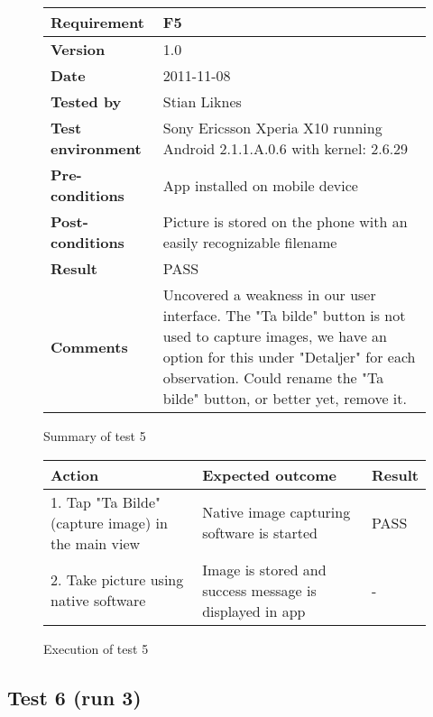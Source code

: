 	\begin{figure}[htb]
		\centering
		\begin{tabular}{|p{3.5cm}|p{7.0cm}|} \hline
			\textbf{Requirement} & F5 \\ \hline
			\textbf{Version} & 1.0 \\ \hline
			\textbf{Date} & 2011-11-08 \\ \hline
			\textbf{Tested by} & Stian Liknes \\ \hline
			\textbf{Test environment} & Sony Ericsson Xperia X10 running Android 2.1.1.A.0.6 with kernel: 2.6.29 \\ \hline
			\textbf{Pre-conditions} & App installed on mobile device \\ \hline
			\textbf{Post-conditions} & Picture is stored on the phone with an easily recognizable filename \\ \hline
			\textbf{Result} & PASS \\ \hline
			\textbf{Comments} & Uncovered a weakness in our user interface. The
			"Ta bilde" button is not used to capture images, we have an option
			for this under "Detaljer" for each observation. Could rename the
				"Ta bilde" button, or better yet, remove it.\\ \hline
		\end{tabular}
		\caption{Summary of test 5}
	\end{figure}

	\begin{figure}[htb]
		\centering
		\begin{tabular}{|p{5.0cm}|p{5.0cm}|p{1cm}|}
			\hline \textbf{Action} & \textbf{Expected outcome} & \textbf{Result} \\ \hline
			1. Tap "Ta Bilde" (capture image) in the main view &
			Native image capturing software is started & 
			PASS \\ \hline

			2. Take picture using native software &
			Image is stored and success message is displayed in app &
			- \\ \hline
		\end{tabular}
		\caption{Execution of test 5}
	\end{figure}

\newpage
\subsection{Test 6 (run 3)}

